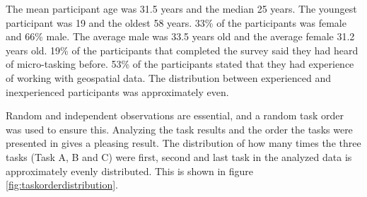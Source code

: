 The mean participant age was 31.5 years and the median 25 years. The youngest participant was 19 and the oldest 58 years. 33\% of the participants was female and 66\% male. The average male was 33.5 years old and the average female 31.2 years old. 19\% of the participants that completed the survey said they had heard of micro-tasking before. 53\% of the participants stated that they had experience of working with geospatial data. The distribution between experienced and inexperienced participants was approximately even. 

Random and independent observations are essential, and a random task order was used to ensure this. Analyzing the task results and the order the tasks were presented in gives a pleasing result. The distribution of how many times the three tasks (Task A, B and C) were first, second and last task in the analyzed data is approximately evenly distributed. This is shown in figure \ref{fig:taskorderdistribution}.

